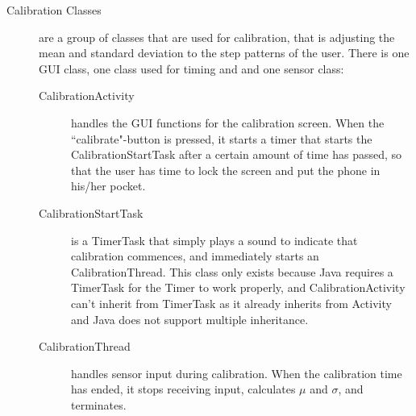 \begin{description}
\item[Calibration Classes]
are a group of classes that are used for calibration, that is adjusting the mean and standard deviation to the step patterns of the user. There is one GUI class, one class used for timing and and one sensor class:
\begin{description}
\item[CalibrationActivity]
handles the GUI functions for the calibration screen. When the ``calibrate"-button is pressed, it starts a timer that starts the CalibrationStartTask after a certain amount of time has passed, so that the user has time to lock the screen and put the phone in his/her pocket.
\item[CalibrationStartTask]
is a TimerTask that simply plays a sound to indicate that calibration commences, and immediately starts an CalibrationThread. This class only exists because Java requires a TimerTask for the Timer to work properly, and CalibrationActivity can't inherit from TimerTask as it already inherits from Activity and Java does not support multiple inheritance. 
\item[CalibrationThread]
handles sensor input during calibration. When the calibration time has ended, it stops receiving input, calculates $\mu$ and $\sigma$, and terminates.
\end{description}
 
\end{description}



